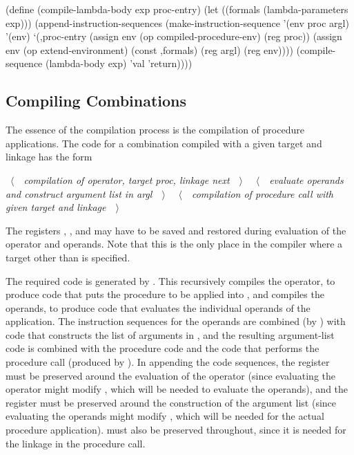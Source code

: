 \begin{codeBlock}
(define (compile-lambda-body exp proc-entry)
  (let ((formals (lambda-parameters exp)))
    (append-instruction-sequences
      (make-instruction-sequence
        '(env proc argl) '(env)
        `(,proc-entry
           (assign env
                   (op compiled-procedure-env)
                   (reg proc))
           (assign env
                   (op extend-environment)
                   (const ,formals)
                   (reg argl)
                   (reg env))))
      (compile-sequence (lambda-body exp)
                        'val
                        'return))))
\end{codeBlock}

\subsection{Compiling Combinations}
\label{Section 5.5.3}

The essence of the compilation process is the compilation of procedure
applications.  The code for a combination compiled with a given target and
linkage has the form

\begin{codeBlock}
~\(\langle \)~~\emph{compilation of operator, target \emph{proc}, linkage \emph{next}}~~\(\rangle \)~
~\(\langle \)~~\emph{evaluate operands and construct argument list in \emph{argl}}~~\(\rangle \)~
~\(\langle \)~~\emph{compilation of procedure call with given target and linkage}~~\(\rangle \)~
\end{codeBlock}

\noindent
The registers , , and  may have to be saved and
restored during evaluation of the operator and operands.  Note that this is the
only place in the compiler where a target other than  is specified.

The required code is generated by .  This recursively
compiles the operator, to produce code that puts the procedure to be applied
into , and compiles the operands, to produce code that evaluates the
individual operands of the application.  The instruction sequences for the
operands are combined (by ) with code that constructs
the list of arguments in , and the resulting argument-list code is
combined with the procedure code and the code that performs the procedure call
(produced by ).  In appending the code sequences,
the  register must be preserved around the evaluation of the operator
(since evaluating the operator might modify , which will be needed to
evaluate the operands), and the  register must be preserved around
the construction of the argument list (since evaluating the operands might
modify , which will be needed for the actual procedure application).
 must also be preserved throughout, since it is needed for the
linkage in the procedure call.

